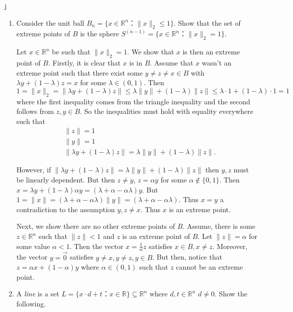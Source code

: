 j\documentclass[11pt]{article}
\institute{\'Ecole Polytechnique F\'ed\'erale de Lausanne}
\newcommand{\setR}{\mathbb{R}}
\renewcommand{\leq}{\leqslant}
\begin{document}
\makeheader

\begin{enumerate}[1)]

\item  \label{item:ex-9}
  Consider the unit ball $B_n = \{ x ∈ ℝ^n ： \|x\|_2≤1\}$. Show that the set of extreme points of $B$ is the sphere $S^{(n-1)} = \{ x ∈ ℝ^n ： \|x\|_2 =1\}$.
  
  \begin{solution}
  Let $x \in \setR^n$ be such that $\|x\|_2 =1$. We show that $x$ is then an extreme point of $B$. Firstly, it is clear that $x$ is in $B$. 
  Assume that $x$ wasn't an extreme point such that there exist some $y \neq z \neq x \in B$ with $\lambda y + (1-\lambda) z = x$ for some $\lambda \in (0,1)$. Then $$1 = \| x\|_2 = \| \lambda y + (1-\lambda) z \| \leq \lambda \|y\| + (1-\lambda)\|z\| \leq \lambda \cdot 1 + (1-\lambda) \cdot 1 = 1$$
where the first inequality comes from the triangle inequality and the second follows from $z, y \in B$. So the inequalities must hold with equality everywhere such that 
\begin{align}
&\|z\| = 1 \\
&\|y\| = 1\\
&\|\lambda y + (1 - \lambda )z \| =  \lambda \|y\| + (1-\lambda)\|z\|. 
\end{align}

However, if $\|\lambda y + (1 - \lambda )z \| =  \lambda \|y\| + (1-\lambda)\|z\|$ then $y, z$ must be linearly dependent. But then $z \neq y$, $z = \alpha y$ for some $\alpha \notin \{0, 1\}$.  Then $x = \lambda y + (1 - \lambda )\alpha y = (\lambda + \alpha- \alpha \lambda) y$. But $ 1 = \|x\| =(\lambda + \alpha - \alpha \lambda)\|y \| = (\lambda + \alpha - \alpha \lambda)$. Thus $x = y$ a contradiction to the assumption $y, z \neq x$. Thus $x$ is an extreme point. 

Next, we show there are no other extreme points of $B$. Assume, there is some $z \in \setR^n$ such that $\|z\| < 1 $ and $z$ is an extreme point of $B$. Let $\|z\| = \alpha$ for some value $\alpha <1$. Then the vector $x = \frac{1}{\alpha}z$ satisfies $x \in B, x \neq z$. Moreover, the vector $ y = \vec{0} $ satisfies $y \neq x, y \neq z, y \in B$. But then, notice that $z = \alpha x + (1-\alpha) y$ where $\alpha \in (0, 1)$ such that $z$ cannot be an extreme point. 




  \end{solution}
  
  
\item \label{item:10}
  A \emph{line} is a set $L = \{ x ⋅ d +t ： x ∈ ℝ\} ⊆ ℝ^n$ where $d,t ∈ ℝ^n$ $d ≠0$. Show the following.


\end{enumerate}
\end{document}

